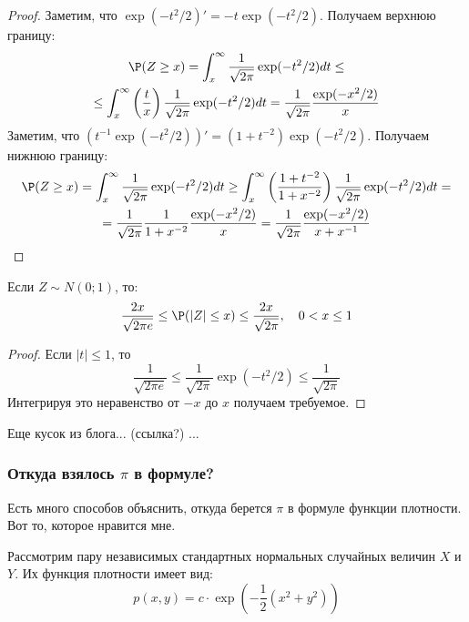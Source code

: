 \begin{proof} Заметим, что $\exp(-t^{2}/2)'=-t\exp(-t^{2}/2)$. Получаем верхнюю границу:
\begin{multline}
\P(Z\geq x)=\int_{x}^{\infty} \frac{1}{\sqrt{2\pi}}\exp(-t^{2}/2)dt\leq \\
\leq \int_{x}^{\infty} \left(\frac{t}{x} \right)\frac{1}{\sqrt{2\pi}}\exp(-t^{2}/2)dt=
\frac{1}{\sqrt{2\pi}}\frac{\exp(-x^{2}/2)}{x}
\end{multline}
Заметим, что $(t^{-1}\exp(-t^{2}/2))'=(1+t^{-2})\exp(-t^{2}/2)$. Получаем нижнюю границу:
\begin{multline}
\P(Z\geq x)=\int_{x}^{\infty} \frac{1}{\sqrt{2\pi}}\exp(-t^{2}/2)dt
\geq \int_{x}^{\infty} \left(\frac{1+t^{-2}}{1+x^{-2}} \right)\frac{1}{\sqrt{2\pi}}\exp(-t^{2}/2)dt= \\
=\frac{1}{\sqrt{2\pi}}\frac{1}{1+x^{-2}}\frac{\exp(-x^{2}/2)}{x}=
\frac{1}{\sqrt{2\pi}}\frac{\exp(-x^{2}/2)}{x+x^{-1}}
\end{multline}

\end{proof}

\begin{myth} Если $Z\sim N(0;1)$, то:
\begin{equation}
\frac{2x}{\sqrt{2\pi e}}\leq \P(|Z|\leq x)\leq \frac{2x}{\sqrt{2\pi}}, \quad 0<x\leq 1
\end{equation}
\end{myth}

\begin{proof}
Если $|t|\leq 1$, то
\begin{equation}
\frac{1}{\sqrt{2\pi e}}\leq \frac{1}{\sqrt{2\pi}}\exp(-t^{2}/2)\leq \frac{1}{\sqrt{2\pi}}
\end{equation}
Интегрируя это неравенство от $-x$ до $x$ получаем требуемое.
\end{proof}


Еще кусок из блога... (ссылка?) ...

\subsubsection*{Откуда взялось $\pi$ в формуле?}

Есть много способов объяснить, откуда берется $\pi$ в формуле функции плотности. Вот то, которое нравится мне.

Рассмотрим пару независимых стандартных нормальных случайных величин $X$ и $Y$. Их функция плотности имеет вид:
\begin{equation}
p(x,y)=c\cdot \exp\left( -\frac{1}{2} (x^{2}+y^{2})\right)
\end{equation}

